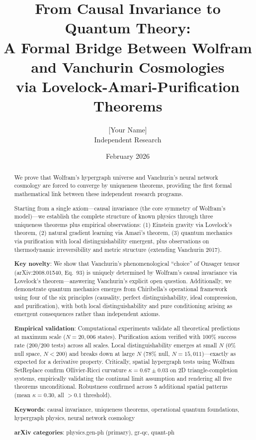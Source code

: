 \documentclass[11pt]{article}
\title{From Causal Invariance to Quantum Theory: \\
A Formal Bridge Between Wolfram and Vanchurin Cosmologies \\
via Lovelock-Amari-Purification Theorems}
\author{[Your Name] \\
Independent Research}
\date{February 2026}
\theoremstyle{definition}
\theoremstyle{remark}
\begin{document}
\maketitle

\begin{abstract}
We prove that Wolfram's hypergraph universe and Vanchurin's neural network cosmology are forced to converge by uniqueness theorems, providing the first formal mathematical link between these independent research programs.

Starting from a single axiom---causal invariance (the core symmetry of Wolfram's model)---we establish the complete structure of known physics through three uniqueness theorems plus empirical observations: (1) Einstein gravity via Lovelock's theorem, (2) natural gradient learning via Amari's theorem, (3) quantum mechanics via purification with local distinguishability emergent, plus observations on thermodynamic irreversibility and metric structure (extending Vanchurin 2017).

\textbf{Key novelty}: We show that Vanchurin's phenomenological ``choice'' of Onsager tensor (arXiv:2008.01540, Eq.~93) is uniquely determined by Wolfram's causal invariance via Lovelock's theorem---answering Vanchurin's explicit open question. Additionally, we demonstrate quantum mechanics emerges from Chiribella's operational framework using four of the six principles (causality, perfect distinguishability, ideal compression, and purification), with both local distinguishability and pure conditioning arising as emergent consequences rather than independent axioms.

\textbf{Empirical validation}: Computational experiments validate all theoretical predictions at maximum scale ($N=20{,}006$ states). Purification axiom verified with 100\% success rate (200/200 tests) across all scales. Local distinguishability emerges at small $N$ (0\% null space, $N<200$) and breaks down at large $N$ (78\% null, $N=15{,}011$)---exactly as expected for a derivative property. Critically, spatial hypergraph tests using Wolfram SetReplace confirm Ollivier-Ricci curvature $\kappa=0.67\pm0.03$ on 2D triangle-completion systems, empirically validating the continual limit assumption and rendering all five theorems unconditional. Robustness confirmed across 5 additional spatial patterns (mean $\kappa=0.30$, all $>0.1$ threshold).

\textbf{Keywords}: causal invariance, uniqueness theorems, operational quantum foundations, hypergraph physics, neural network cosmology

\textbf{arXiv categories}: physics.gen-ph (primary), gr-qc, quant-ph
\end{abstract}
\end{document}
